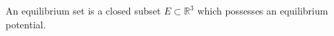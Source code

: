 An equilibrium set is a closed subset $E \subset \mathbb{R}^3$ which possesses an equilibrium potential.
